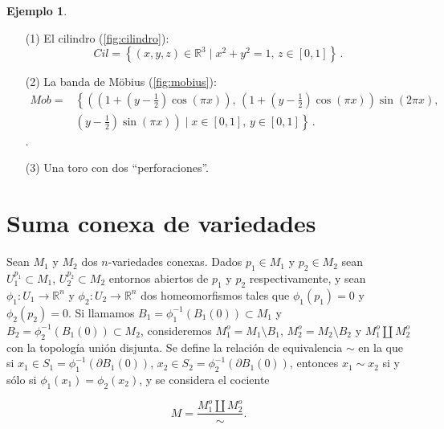 \documentclass[10pt]{report}
\newcommand{\R}{\mathbb{R}}
\theoremstyle{definition}
\newtheorem{eje}[defin]{Ejemplo}
\begin{document}
\begin{eje}\label{eje:rep_borde}
\begin{itemize}
\item[(1)] El cilindro  (\autoref{fig:cilindro}): $$Cil=\left\{(x,y,z)\in \R^3 \mid x^2+y^2=1,\, z\in \left[ 0,1\right] \right\} \,.$$
\item[(2)] La banda de Möbius (\autoref{fig:mobius}):
\begin{align*}
Mob=
& \left\{ \left(\left(1+\left(y-\frac{1}{2}\right)\cos \left(\pi x\right)\right), \, \left(1+\left(y-\frac{1}{2}\right)\cos \left(\pi x\right)\right)\sin \left( 2 \pi x\right), \right. \right.\\
& \left. \left. \left( y-\frac{1}{2} \right)\sin \left( \pi x\right)\right) \mid x\in \left[0,1\right], \, y\in \left[0,1\right] \right\} \, .
\end{align*}.
\item[(3)] Una toro con dos ``perforaciones''.
\end{itemize}
\end{eje}

\section{Suma conexa de variedades}
Sean $M_1$ y $M_2$ dos $n$-variedades conexas. Dados $p_1\in M_1$ y $p_2\in M_2$ sean $U_1^{p_1}\subset M_1$, $U_2^{p_2}\subset M_2$  entornos abiertos de $p_1$ y $p_2$ respectivamente, y sean $\phi_1:U_1\to\R^n$ y $\phi_2:U_2\to\R^n$ dos homeomorfismos tales que $\phi_1(p_1)=0$ y $\phi_2(p_2)=0$. Si llamamos $B_1=\phi_1^{-1}(B_1(0))\subset M_1$ y $B_2=\phi_2^{-1}(B_1(0))\subset M_2$, consideremos $M_1^o=M_1\setminus B_1$, $M_2^o=M_2\setminus B_2$ y $M_1^o \amalg M_2^o$ con la topología unión disjunta.
Se define la relación de equivalencia $\sim$ en la que si $x_1\in S_1=\phi_1^{-1}(\partial B_1(0))$, $x_2\in S_2=\phi_2^{-1}(\partial B_1(0))$, entonces $x_1\sim x_2$ si y sólo si $\phi_1(x_1)=\phi_2(x_2)$, y se considera el cociente 

$$M=\frac{M_1^o\amalg M_2^o}{\sim}.$$
\end{document}
